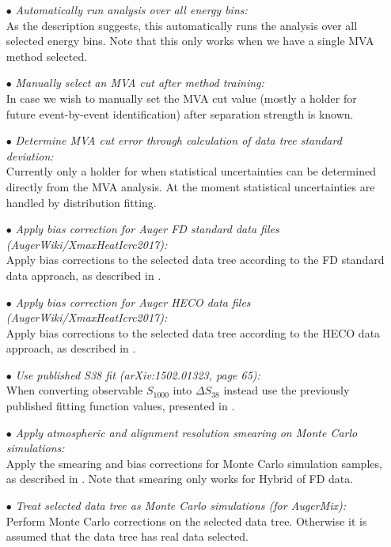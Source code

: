 \documentclass[12pt,a4paper]{report}
\begin{document}
\begin{itemize}
\item[$\bullet$] \emph{Automatically run analysis over all energy bins:}\\As the description suggests, this automatically runs the analysis over all selected energy bins. Note that this only works when we have a single MVA method selected.
\item[$\bullet$] \emph{Manually select an MVA cut after method training:}\\In case we wish to manually set the MVA cut value (mostly a holder for future event-by-event identification) after separation strength is known.
\item[$\bullet$] \emph{Determine MVA cut error through calculation of data tree standard deviation:}\\Currently only a holder for when statistical uncertainties can be determined directly from the MVA analysis. At the moment statistical uncertainties are handled by distribution fitting.
\item[$\bullet$] \emph{Apply bias correction for Auger FD standard data files (AugerWiki/XmaxHeatIcrc2017):}\\Apply bias corrections to the selected data tree according to the FD standard data approach, as described in \cite{CompositionAugerWiki}.
\item[$\bullet$] \emph{Apply bias correction for Auger HECO data files (AugerWiki/XmaxHeatIcrc2017):}\\Apply bias corrections to the selected data tree according to the HECO data approach, as described in \cite{CompositionAugerWiki}.
\item[$\bullet$] \emph{Use published S38 fit (arXiv:1502.01323, page 65):}\\When converting observable $S_{1000}$ into $\Delta S_{38}$ instead use the previously published fitting function values, presented in \cite{paoDesignReport}.
\item[$\bullet$] \emph{Apply atmospheric and alignment resolution smearing on Monte Carlo simulations:}\\Apply the smearing and bias corrections for Monte Carlo simulation samples, as described in \cite{xmaxMoments,xmaxUnger}. Note that smearing only works for Hybrid of FD data.
\item[$\bullet$] \emph{Treat selected data tree as Monte Carlo simulations (for AugerMix):}\\Perform Monte Carlo corrections on the selected data tree. Otherwise it is assumed that the data tree has real data selected.
\end{itemize}
\end{document}
